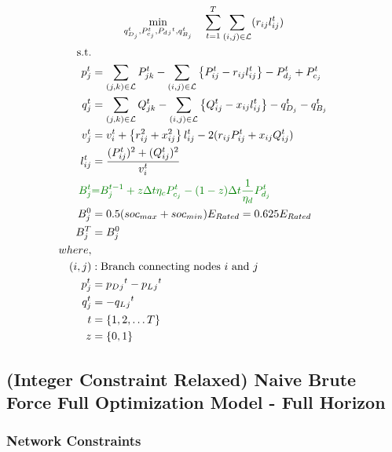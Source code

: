 \begin{gather}
    \min_{q_{D_j}^t,
	P_{c_j}^t, P_d{_j}^t, q_{B_j}^t} \quad
	\sum_{t = 1}^{T} \sum_{(i, j) \in \mathcal{L}} (r_{ij}l_{ij}^t) \\
	\begin{align}
		\text{s.t.} & {}\nonumber \\
		{p_j^t} & = {\sum_{(j, k) \in \mathcal{L}} P_{jk}^t - \sum_{(i, j) \in \mathcal{L}}\left\{P_{ij}^t - r_{ij}l_{ij}^t\right\} - P_{d_j}^t + P_{c_j}^t} && \\
		{q_j^t} & = {\sum_{(j, k) \in \mathcal{L}} Q_{jk}^t - \sum_{(i, j) \in \mathcal{L}}\left\{Q_{ij}^t - x_{ij}l_{ij}^t\right\} - q_{D_j}^t - q_{B_j}^t} && \\
		{v_j^t} & = {v_{i}^t +  \left\{r_{ij}^2 + x_{ij}^2\right\}l_{ij}^t - 2(r_{ij}P_{ij}^t + x_{ij}Q_{ij}^t)} && \\
		{l_{ij}^t} & = {\frac{(P_{ij}^{t})^2 + (Q_{ij}^{t})^2}{v_i^t}} \\
		{\color{darkgreen}{ B_{j}^{t} }} &\color{darkgreen}{=} { \color{darkgreen}{ B_{j}^{t-1} + z \Delta t  \eta_c P_{c_j}^t - (1-z) \Delta t\frac{1}{\eta_d} P_{d_j}^t } } \\
		{ B_{j}^{0} } &= { 0.5(soc_{max}+soc_{min})E_{Rated} = 0.625E_{Rated}} \\
		{ B_{j}^{T} } &= { B_{j}^{0}} \\
		{where,} & {} \\
		{(i, j)} &: {\text{Branch connecting nodes $i$ and $j$}} \\
		{p_j^t} &= {p_D{_j}^t - p_L{_j}^t} \\
		{q_j^t} &= {-q_L{_j}^t} \\
		{t} &= {\{1, 2, \ldots T\}} \\
		{z} &= {\{0, 1\}}
	\end{align}
\end{gather}

\subsection*{(Integer Constraint Relaxed) Naive Brute Force Full Optimization Model - Full Horizon}

\subsubsection*{Network Constraints}

